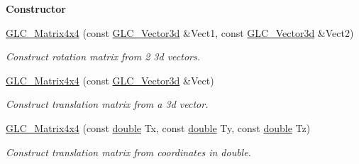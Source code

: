 \begin{Indent}{\bf Constructor}
\begin{DoxyCompactItemize}
\hyperlink{class_g_l_c___matrix4x4_a692850d08e7d354cdb138b996b9c4b41}{G\-L\-C\-\_\-\-Matrix4x4} (const \hyperlink{class_g_l_c___vector3d}{G\-L\-C\-\_\-\-Vector3d} \&Vect1, const \hyperlink{class_g_l_c___vector3d}{G\-L\-C\-\_\-\-Vector3d} \&Vect2)
\begin{DoxyCompactList}\small\item\em Construct rotation matrix from 2 3d vectors. \end{DoxyCompactList}\item 
\hyperlink{class_g_l_c___matrix4x4_a68d1f572b4ea78cabc90ad75bde82dbb}{G\-L\-C\-\_\-\-Matrix4x4} (const \hyperlink{class_g_l_c___vector3d}{G\-L\-C\-\_\-\-Vector3d} \&Vect)
\begin{DoxyCompactList}\small\item\em Construct translation matrix from a 3d vector. \end{DoxyCompactList}\item 
\hyperlink{class_g_l_c___matrix4x4_a76d0a48f8295a10dd2768926ae570304}{G\-L\-C\-\_\-\-Matrix4x4} (const \hyperlink{_super_l_u_support_8h_a8956b2b9f49bf918deed98379d159ca7}{double} Tx, const \hyperlink{_super_l_u_support_8h_a8956b2b9f49bf918deed98379d159ca7}{double} Ty, const \hyperlink{_super_l_u_support_8h_a8956b2b9f49bf918deed98379d159ca7}{double} Tz)
\begin{DoxyCompactList}\small\item\em Construct translation matrix from coordinates in double. \end{DoxyCompactList}\end{DoxyCompactItemize}
\end{Indent}
